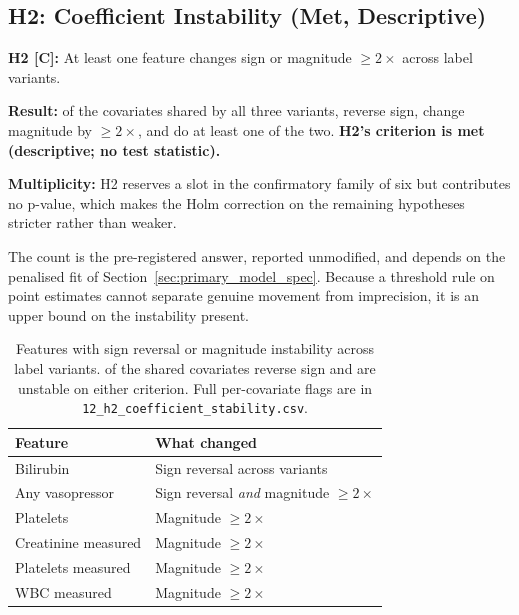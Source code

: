 \subsection{H2: Coefficient Instability (Met, Descriptive)}
\label{sec:h2}

\begin{mdframed}[backgroundcolor=ATUSand!30, linecolor=ATUGreen]
    \textbf{H2 [C]:} At least one feature changes sign or magnitude
    $\geq 2\times$ across label variants.

    \textbf{Result:} of the \pcHTwoNTerms{} covariates shared by all three
    variants, \pcHTwoNSign{} reverse sign, \pcHTwoNMag{} change magnitude by
    $\geq 2\times$, and \pcHTwoEst{} do at least one of the two.
    \textbf{H2's criterion is met (descriptive; no test statistic).}

    \textbf{Multiplicity:} H2 reserves a slot in the confirmatory family of six
    but contributes no p-value, which makes the Holm correction on the
    remaining hypotheses stricter rather than weaker.
\end{mdframed}

The count is the pre-registered answer, reported unmodified, and depends on the
penalised fit of Section~\ref{sec:primary_model_spec}. Because a threshold rule
on point estimates cannot separate genuine movement from imprecision, it is an
upper bound on the instability present.

\begin{table}[H]
    \centering
    \begin{tabular}{lp{8cm}}
        \toprule
        \textbf{Feature}           & \textbf{What changed}                   \\
        \midrule
        Bilirubin                  & Sign reversal across variants           \\
        Any vasopressor            & Sign reversal \emph{and} magnitude $\geq 2\times$ \\
        Platelets                  & Magnitude $\geq 2\times$                \\
        Creatinine measured        & Magnitude $\geq 2\times$                \\
        Platelets measured         & Magnitude $\geq 2\times$                \\
        WBC measured               & Magnitude $\geq 2\times$                \\
        \bottomrule
    \end{tabular}
    \caption{Features with sign reversal or magnitude instability across label
    variants. \pcHTwoNSign{} of the \pcHTwoNTerms{} shared covariates reverse
    sign and \pcHTwoEst{} are unstable on either criterion. Full per-covariate
    flags are in \texttt{12\_h2\_coefficient\_stability.csv}.}
    \label{tab:coef_instability}
\end{table}

